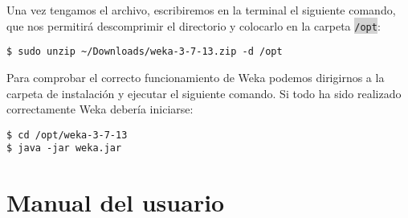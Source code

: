 Una vez tengamos el archivo, escribiremos en la terminal el siguiente comando, que nos permitirá descomprimir el directorio y colocarlo en la carpeta \colorbox{lightgray}{\lstinline|/opt|}:

\begin{lstlisting}
$ sudo unzip ~/Downloads/weka-3-7-13.zip -d /opt
\end{lstlisting}

Para comprobar el correcto funcionamiento de Weka podemos dirigirnos a la carpeta de instalación y ejecutar el siguiente comando. Si todo ha sido realizado correctamente Weka debería iniciarse:

\begin{lstlisting}
$ cd /opt/weka-3-7-13
$ java -jar weka.jar
\end{lstlisting}

\section{Manual del usuario}


